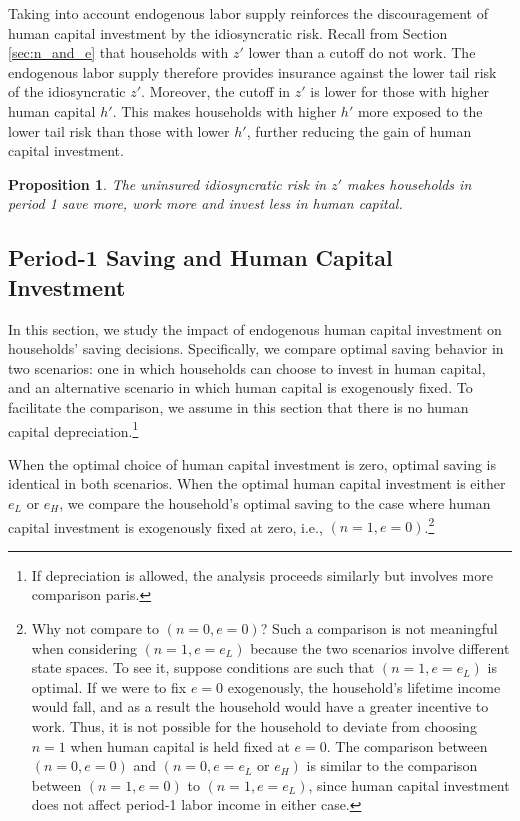 \documentclass[12pt]{article}
\newtheorem{proposition}{Proposition}
\begin{document}
Taking into account endogenous labor supply reinforces the discouragement of human capital investment by the idiosyncratic risk. Recall from Section \ref{sec:n_and_e} that households with $z'$ lower than a cutoff do not work. The endogenous labor supply therefore provides insurance against the lower tail risk of the idiosyncratic $z'$. Moreover, the cutoff in $z'$ is lower for those with higher human capital $h'$. This makes households with higher $h'$ more exposed to the lower tail risk than those with lower $h'$, further reducing the gain of human capital investment.


\begin{proposition}
    The uninsured idiosyncratic risk in $z'$ makes households in period 1 save more, work more and invest less in human capital.
\end{proposition}


\subsection{Period-1 Saving and Human Capital Investment}\label{sec:saving}
In this section, we study the impact of endogenous human capital investment on households’ saving decisions. Specifically, we compare optimal saving behavior in two scenarios: one in which households can choose to invest in human capital, and an alternative scenario in which human capital is exogenously fixed. To facilitate the comparison, we assume in this section that there is no human capital depreciation.\footnote{If depreciation is allowed, the analysis proceeds similarly but involves more comparison paris.}

When the optimal choice of human capital investment is zero, optimal saving is identical in both scenarios. When the optimal human capital investment is either $e_L$ or $e_H$, we compare the household's optimal saving to the case where human capital investment is exogenously fixed at zero, i.e., $(n=1, e=0)$.\footnote{Why not compare to $(n=0,e=0)$? Such a comparison is not meaningful when considering $(n=1, e=e_L)$ because the two scenarios involve different state spaces. To see it, suppose conditions are 
such that $(n=1,e=e_L)$ is optimal. If we were to fix $e=0$ 
exogenously, the household’s lifetime income would fall, 
and as a result the household would have a greater 
incentive to work. Thus, it is not possible for the 
household to deviate from choosing $n=1$ when human capital 
is held fixed at $e=0$. The comparison between $(n=0,e=0)$ 
and $(n=0,e=e_L \text{ or } e_H)$ is similar to the 
comparison between $(n=1,e=0)$ to $(n=1,e=e_L)$, since human capital investment does not affect period-1 labor income in either case.}
\end{document}
